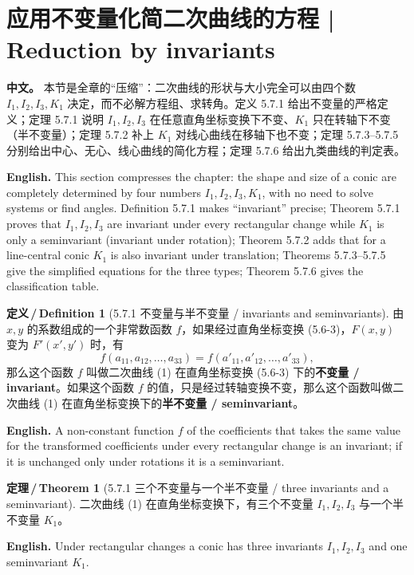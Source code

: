 \documentclass[UTF8,11pt,a4paper]{ctexart}
\newcommand{\APS}[2]{\par\noindent\textbf{中文。} #1\par\noindent\textbf{English.} #2\par\smallskip}
\newcommand{\EN}[1]{\par\noindent \textbf{English.} #1\par}
\theoremstyle{definition}
\newtheorem*{definition}{定义\,/\,Definition}
\newtheorem*{theorem}{定理\,/\,Theorem}
\begin{document}
\section{\label{sec:15}应用不变量化简二次曲线的方程 | Reduction by invariants}
\APS{本节是全章的``压缩''：二次曲线的形状与大小完全可以由四个数 $I_1,I_2,I_3,K_1$ 决定，而不必解方程组、求转角。定义 5.7.1 给出不变量的严格定义；定理 5.7.1 说明 $I_1,I_2,I_3$ 在任意直角坐标变换下不变、$K_1$ 只在转轴下不变（半不变量）；定理 5.7.2 补上 $K_1$ 对线心曲线在移轴下也不变；定理 5.7.3--5.7.5 分别给出中心、无心、线心曲线的简化方程；定理 5.7.6 给出九类曲线的判定表。}{This section compresses the chapter: the shape and size of a conic are completely determined by four numbers $I_1,I_2,I_3,K_1$, with no need to solve systems or find angles. Definition 5.7.1 makes ``invariant'' precise; Theorem 5.7.1 proves that $I_1,I_2,I_3$ are invariant under every rectangular change while $K_1$ is only a seminvariant (invariant under rotation); Theorem 5.7.2 adds that for a line-central conic $K_1$ is also invariant under translation; Theorems 5.7.3--5.7.5 give the simplified equations for the three types; Theorem 5.7.6 gives the classification table.}

\begin{definition}[5.7.1 不变量与半不变量 / invariants and seminvariants]\label{def:invariant}
由 $x,y$ 的系数组成的一个非常数函数 $f$，如果经过直角坐标变换 (5.6-3)，$F(x,y)$ 变为 $F'(x',y')$ 时，有
\[
f(a_{11},a_{12},\dots,a_{33})=f(a'_{11},a'_{12},\dots,a'_{33}),
\]
那么这个函数 $f$ 叫做二次曲线 (1) 在直角坐标变换 (5.6-3) 下的\textbf{不变量 / invariant}。如果这个函数 $f$ 的值，只是经过转轴变换不变，那么这个函数叫做二次曲线 (1) 在直角坐标变换下的\textbf{半不变量 / seminvariant}。
\EN{A non-constant function $f$ of the coefficients that takes the same value for the transformed coefficients under every rectangular change is an invariant; if it is unchanged only under rotations it is a seminvariant.}
\end{definition}

\begin{theorem}[5.7.1 三个不变量与一个半不变量 / three invariants and a seminvariant]\label{thm:invariants}
二次曲线 (1) 在直角坐标变换下，有三个不变量 $I_1,I_2,I_3$ 与一个半不变量 $K_1$。
\EN{Under rectangular changes a conic has three invariants $I_1,I_2,I_3$ and one seminvariant $K_1$.}
\end{theorem}
\end{document}
